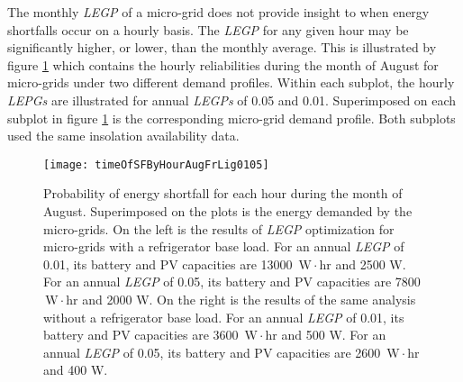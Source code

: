 \documentclass{article}
\newcommand{\unit}[1]{\ensuremath{\, \mathrm{#1}}}
\begin{document}
	

The monthly \emph{LEGP} of a micro-grid does not provide insight to when energy shortfalls occur on a hourly basis. 
The \emph{LEGP} for any given hour may be significantly higher, or lower, than the monthly average.  
This is illustrated by figure \ref{hourlyLEGP} which contains the hourly reliabilities during the month of August for micro-grids under two different demand profiles.
Within each subplot, the hourly \emph{LEPGs} are illustrated for annual \emph{LEGPs} of 0.05 and 0.01. 
Superimposed on each subplot in figure \ref{hourlyLEGP} is the corresponding micro-grid demand profile. 
Both subplots used the same insolation availability data. 

\begin{figure}[ht]
\centering
\texttt{[image: timeOfSFByHourAugFrLig0105]}
\caption{Probability of energy shortfall for each hour during the month of August. 
Superimposed on the plots is the energy demanded by the micro-grids. 
On the left is the results of \emph{LEGP} optimization for micro-grids with a refrigerator base load. 
For an annual \emph{LEGP} of 0.01, its battery and PV capacities are 13000 \unit{W \! \cdot \!hr} and 2500 W.
For an annual \emph{LEGP} of 0.05, its battery and PV capacities are 7800 \unit{W \! \cdot \!hr} and 2000 W.
On the right is the results of the same analysis without a refrigerator base load. 
For an annual \emph{LEGP} of 0.01, its battery and PV capacities are 3600 \unit{W \! \cdot \!hr} and 500 W.
For an annual \emph{LEGP} of 0.05, its battery and PV capacities are 2600 \unit{W \! \cdot \!hr} and 400 W.}
\label{hourlyLEGP}
\end{figure} 
\end{document}
